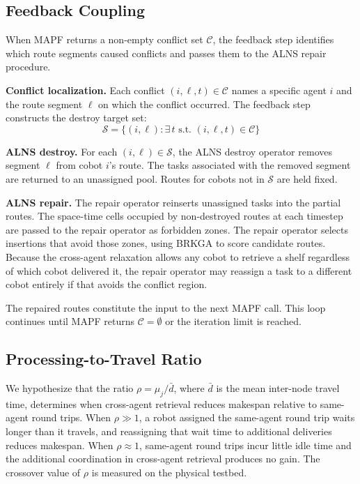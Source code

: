 \documentclass{article}
\begin{document}
\subsection{Feedback Coupling}

When MAPF returns a non-empty conflict set $\mathcal{C}$, the feedback step
identifies which route segments caused conflicts and passes them to the ALNS
repair procedure.

\textbf{Conflict localization.} Each conflict $(i, \ell, t) \in \mathcal{C}$
names a specific agent $i$ and the route segment $\ell$ on which the conflict
occurred. The feedback step constructs the destroy target set:
\begin{equation}
    \mathcal{S} = \{(i, \ell) : \exists\, t \text{ s.t. } (i, \ell, t) \in \mathcal{C}\}
\end{equation}

\textbf{ALNS destroy.} For each $(i, \ell) \in \mathcal{S}$, the ALNS destroy
operator removes segment $\ell$ from cobot $i$'s route. The tasks associated
with the removed segment are returned to an unassigned pool. Routes for cobots
not in $\mathcal{S}$ are held fixed.

\textbf{ALNS repair.} The repair operator reinserts unassigned tasks into the
partial routes. The space-time cells occupied by non-destroyed routes at each
timestep are passed to the repair operator as forbidden zones. The repair
operator selects insertions that avoid those zones, using BRKGA to score
candidate routes. Because the cross-agent relaxation allows any cobot to
retrieve a shelf regardless of which cobot delivered it, the repair operator
may reassign a task to a different cobot entirely if that avoids the conflict
region.

The repaired routes constitute the input to the next MAPF call. This loop
continues until MAPF returns $\mathcal{C} = \emptyset$ or the iteration
limit is reached.

\subsection{Processing-to-Travel Ratio}

We hypothesize that the ratio $\rho = \mu_j / \bar{d}$, where $\bar{d}$ is the
mean inter-node travel time, determines when cross-agent retrieval reduces
makespan relative to same-agent round trips. When $\rho \gg 1$, a robot
assigned the same-agent round trip waits longer than it travels, and
reassigning that wait time to additional deliveries reduces makespan. When
$\rho \approx 1$, same-agent round trips incur little idle time and the
additional coordination in cross-agent retrieval produces no gain. The crossover
value of $\rho$ is measured on the physical testbed.
\end{document}
